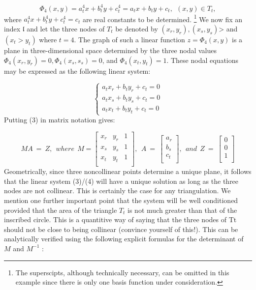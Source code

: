 \documentclass[../main.tex]{subfiles}
\begin{document}
\begin{equation}\label{eqa2}
\Phi_4(x,y)=a_t^4x+b_t^4y+c_t^4=a_tx+b_ty+c_t,~~(x,y) \in T_t,
\end{equation}
where $a_t^4x+b_t^4y+c_t^4=c_t$ are real constants to be determined.
\footnote{The superscipts, although technically necessary, can be omitted in this example since there is only one 
basis function under consideration. }
We now fix an index $\mathfrak{l}$ and let the three nodes of $T_t$ be denoted by $(x_r,y_r), (x_s,y_s)$> and $(x_t>y_t)$ where $t = 4$. The graph of such a linear function $z = \Phi_4(x,y)$ is a plane in three-dimensional space determined by the three nodal values $\Phi_4(x_r ,y_r ) = 0, \Phi_4(x_s,s_s) = 0$, and $\Phi_4(x_t,y_t) = 1$. These nodal equations may be expressed as the following linear system: 

\begin{equation}\label{eqa3}
	\begin{cases}
		a_t x_r+b_t y_r+c_t=0\\
		a_t x_s+b_t y_s+c_t=0\\
		a_t x_t+b_t y_t+c_t=0
	\end{cases}
\end{equation}
Putting (3) in matrix notation gives:


\begin{equation}\label{eqa4}
MA~=~Z, ~~where~~M=
	\begin{bmatrix} 
		  x_r&y_r&1\\
		  x_s&y_s&1\\
		  x_t&y_t&1\\	 
	\end{bmatrix},~~
	A~=~
	\begin{bmatrix} 
		  a_r\\
		  b_s\\
		  c_t\\	 
	\end{bmatrix},~~ and~~Z~=~
	\begin{bmatrix} 
		  0\\
		  0\\
		  1\\	 
	\end{bmatrix}
\end{equation}
Geometrically, since three noncollinear points determine a unique plane, it follows that the linear system (3)/(4) will have a unique solution as long as the three nodes are not collinear. This is certainly the case for any triangulation. We mention one further important point that the system will be well conditioned provided that the area of the triangle $T_t$ is not much greater than that of the inscribed circle. This is a quantitive way of saying that the three nodes of Tt should not be close to being collinear (convince yourself of this!). This can be analytically verified using the following explicit formulas for the determinant of $M$ and $M^{-1}$ : 
\end{document}
